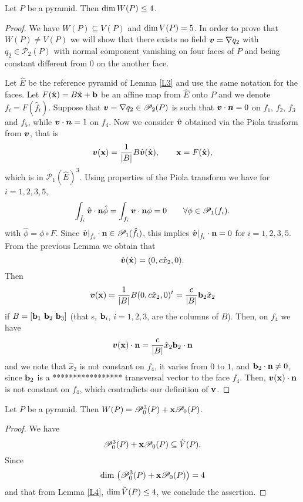 \begin{lemma}\label{L4}
Let $P$ be a pyramid. Then $\mbox{dim\,}W(P)\le4$.
\end{lemma}
\begin{proof}
We have $W(P)\subseteq V(P)$ and $\mbox{dim\,}V(P)=5$. In order to prove that $W(P)\ne
V(P)$ we will show that there exists no field
$\boldsymbol{v}=\nabla q_2$ with $q_2\in \mathcal P_2(P)$ with normal
component vanishing on four faces of $P$ and being constant different from $0$ on
the another face.

Let $\hat E$ be the reference pyramid of Lemma \ref{L3} and
use the same notation for the faces. Let $F(\hat {\bf x})=B\hat
{\bf x} + {\bf b}$ be an affine map from $\hat E$ onto $P$ and we denote
$f_i=F(\hat f_i)$. Suppose
that $\boldsymbol{v}=\nabla q_2\in \mathcal P_2(P)$ is such that
$\boldsymbol{v}\cdot\boldsymbol{n}=0$ on $f_1$, $f_2$, $f_3$ and $f_5$, while
$\boldsymbol{v}\cdot\boldsymbol{n}=1$ on $f_4$. Now we consider $\hat{\boldsymbol{v}}$
obtained via the Piola trasform from $\boldsymbol{v}$, that is
\begin{equation}\label{piola}
\boldsymbol{v}({\bf x}) = \frac1{|B|}B\hat{\boldsymbol{v}}(\hat{\bf x}), \qquad {\bf x}=F(\hat {\bf x}),
\end{equation}
which is in $\mathcal P_1(\hat E)^3$. Using properties of the Piola transform
\cite[pages 12--14]{ricardoMixed} we have for $i=1,2,3,5$,
\[
\int_{\hat f_i}\hat {\boldsymbol{v}}\cdot {\bf n}\hat\phi = \int_{f_i}\boldsymbol{v}\cdot {\bf n}\phi =0\qquad \forall \phi\in\mathcal P_1(f_i).
\]
with $\hat \phi = \phi\circ F$. Since $\hat{\boldsymbol{v}}|_{\hat f_i}\cdot {\bf n}\in\mathcal P_1(\hat f_i)$, this implies $\hat{\boldsymbol{v}}|_{\hat f_i}\cdot {\bf n}=0$ for $i=1,2,3,5$. From the previous Lemma we obtain that
\[
\hat{\boldsymbol{v}}(\hat{\bf x})=(0,c\hat x_2,0).
\]
Then
\[
\boldsymbol{v}({\bf x})=\frac1{|B|}B(0,c\hat x_2,0)^t = \frac c{|B|}{\bf b}_2 \hat x_2
\]
if $B=[{\bf b}_1\,\,{\bf b}_2\,\,{\bf b}_3]$ (that s, ${\bf b}_i$, $i=1,2,3$,  are the columns of $B$). Then, on $f_4$ we have 
\[
\boldsymbol{v}({\bf x})\cdot {\bf n}=\frac c{|B|}\hat x_2{\bf b}_2\cdot {\bf n} 
\]
and we note that $\hat x_2$ is not constant on $f_4$, it varies from $0$ to $1$,
and ${\bf b}_2\cdot {\bf n}\ne 0$, since ${\bf b}_2$ is a 
{\color{Orange}***************** transversal} 
vector to
the face $f_4$. Then, $\boldsymbol{v}({\bf x})\cdot {\bf n}$ is not constant on $f_4$,
which contradicts our definition of $\bf v$.  
\end{proof}

\begin{proposition}
Let $P$ be a pyramid. Then $W(P)=\mathcal
P_0^3(P)+{\bf x}\mathcal P_0(P)$.
\end{proposition}
\begin{proof}
We have
\[
\mathcal P_0^3(P)+{\bf x}\mathcal P_0(P)\subseteq \hat
V(P).
\]
Since
\[
\mbox{dim\,}\left(\mathcal P_0^3(P)+{\bf x}\mathcal
P_0(P)\right)=4
\]
and that from Lemma \ref{L4}, $\mbox{dim\,}\hat
V(P)\le4$, we conclude the assertion.
\end{proof}

